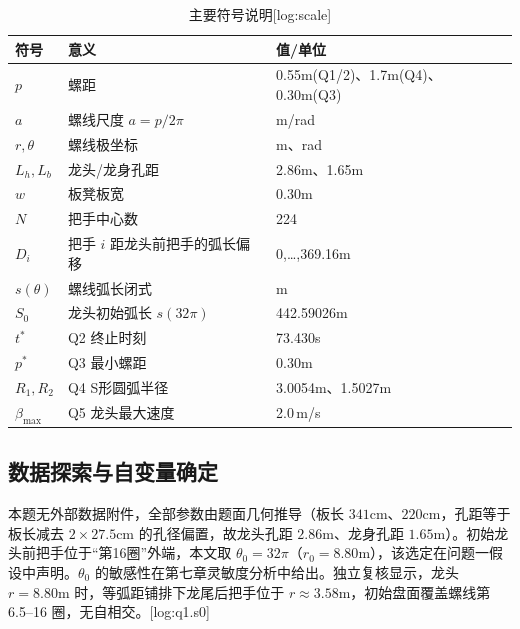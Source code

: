 \begin{table}[H]\centering
\caption{主要符号说明[log:scale]}
\label{tab:sym}\begin{tabular}{lll}
\toprule
符号 & 意义 & 值/单位 \\
\midrule
$p$ & 螺距 & 0.55m(Q1/2)、1.7m(Q4)、0.30m(Q3) \\
$a$ & 螺线尺度 $a=p/2\pi$ & m/rad \\
$r,\theta$ & 螺线极坐标 & m、rad \\
$L_h,L_b$ & 龙头/龙身孔距 & 2.86m、1.65m \\
$w$ & 板凳板宽 & 0.30m \\
$N$ & 把手中心数 & 224 \\
$D_i$ & 把手 $i$ 距龙头前把手的弧长偏移 & 0,…,369.16m \\
$s(\theta)$ & 螺线弧长闭式 & m \\
$S_0$ & 龙头初始弧长 $s(32\pi)$ & 442.59026m \\
$t^{\ast}$ & Q2 终止时刻 & 73.430s \\
$p^{\ast}$ & Q3 最小螺距 & 0.30m \\
$R_1,R_2$ & Q4 S形圆弧半径 & 3.0054m、1.5027m \\
$\beta_{\max}$ & Q5 龙头最大速度 & 2.0\,m/s \\
\bottomrule
\end{tabular}
\end{table}

\subsection{数据探索与自变量确定}
本题无外部数据附件，全部参数由题面几何推导（板长 $341$cm、$220$cm，孔距等于板长减去 $2\times27.5$cm 的孔径偏置，故龙头孔距 $2.86$m、龙身孔距 $1.65$m）。初始龙头前把手位于“第16圈”外端，本文取 $\theta_0=32\pi$（$r_0=8.80$m），该选定在问题一假设中声明。$\theta_0$ 的敏感性在第七章灵敏度分析中给出。独立复核显示，龙头 $r=8.80$m 时，等弧距铺排下龙尾后把手位于 $r\approx3.58$m，初始盘面覆盖螺线第 6.5--16 圈，无自相交。[log:q1.s0]